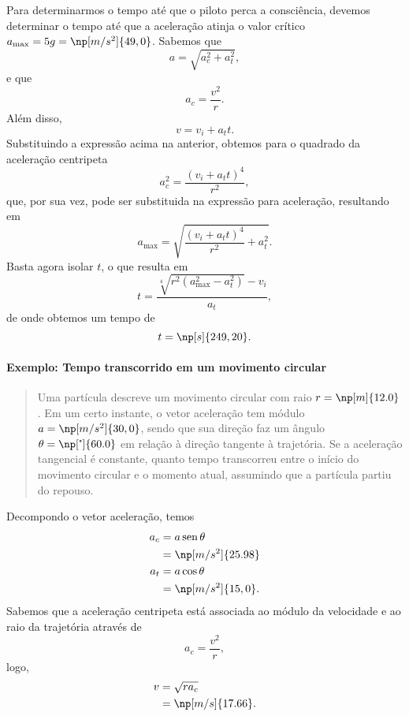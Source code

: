 Para determinarmos o tempo até que o piloto perca a consciência, devemos determinar o tempo até que a aceleração atinja o valor crítico $a_{\textrm{max}} = 5g = \np[m/s^2]{49,0}$. Sabemos que
\begin{equation}
	a = \sqrt{a_c^2 + a_t^2},
\end{equation}
%
e que
\begin{equation}
	a_c = \frac{v^2}{r}.
\end{equation}
%
Além disso,
\begin{equation}
	v = v_i + a_t t.
\end{equation}
%
Substituindo a expressão acima na anterior, obtemos para o quadrado da aceleração centripeta
\begin{equation}
	a_c^2 = \frac{(v_i + a_t t)^4}{r^2},
\end{equation}
%
que, por sua vez, pode ser substituida na expressão para aceleração, resultando em
\begin{equation}
	a_{\textrm{max}} = \sqrt{\frac{(v_i + a_t t)^4}{r^2} + a_t^2}.
\end{equation}
%
Basta agora isolar $t$, o que resulta em
\begin{equation}
	t = \frac{\sqrt[4]{r^2(a_{\textrm{max}}^2 - a_t^2)} - v_i}{a_t},
\end{equation}
%
de onde obtemos um tempo de
\begin{equation}
	t = \np[s]{249,20}.
\end{equation}

\paragraph{Exemplo: Tempo transcorrido em um movimento circular}

\begin{quote}
	Uma partícula descreve um movimento circular com raio $r = \np[m]{12.0}$. Em um certo instante, o vetor aceleração tem módulo $a = \np[m/s^2]{30,0}$, sendo que sua direção faz um ângulo $\theta = \np[\tcdegree]{60.0}$ em relação à direção tangente à trajetória. Se a aceleração tangencial é constante, quanto tempo transcorreu entre o início do movimento circular e o momento atual, assumindo que a partícula partiu do repouso.
\end{quote}

Decompondo o vetor aceleração, temos
\begin{align}
	a_c &= a\sen\theta \\
	&= \np[m/s^2]{25.98} \\
	a_t &= a\cos\theta \\
	&= \np[m/s^2]{15,0}.
\end{align}
%
Sabemos que a aceleração centripeta está associada ao módulo da velocidade e ao raio da trajetória através de
\begin{equation}
	a_c = \frac{v^2}{r},
\end{equation}
%
logo,
\begin{align}
	v &= \sqrt{r a_c} \\
	&= \np[m/s]{17.66}.
\end{align}

